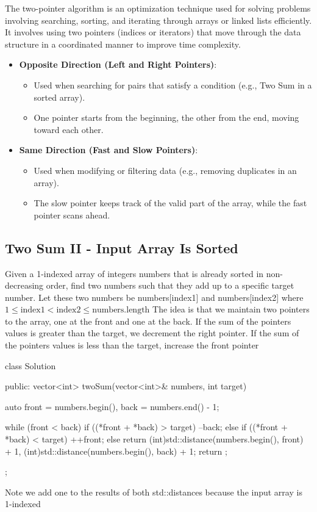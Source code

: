 \documentclass{report}
\begin{document}
\pagebreak 
{}
\bigbreak \noindent 
The two-pointer algorithm is an optimization technique used for solving problems involving searching, sorting, and iterating through arrays or linked lists efficiently. It involves using two pointers (indices or iterators) that move through the data structure in a coordinated manner to improve time complexity.
\begin{itemize}
    \item \textbf{Opposite Direction (Left and Right Pointers)}:
        \begin{itemize}
            \item Used when searching for pairs that satisfy a condition (e.g., Two Sum in a sorted array).
            \item One pointer starts from the beginning, the other from the end, moving toward each other.
        \end{itemize}
    \item \textbf{Same Direction (Fast and Slow Pointers)}:
        \begin{itemize}
            \item Used when modifying or filtering data (e.g., removing duplicates in an array).
            \item The slow pointer keeps track of the valid part of the array, while the fast pointer scans ahead.
        \end{itemize}
\end{itemize}

\bigbreak \noindent 
\subsection{Two Sum II - Input Array Is Sorted}
\bigbreak \noindent 
Given a 1-indexed array of integers numbers that is already sorted in non-decreasing order, find two numbers such that they add up to a specific target number. Let these two numbers be numbers[index1] and numbers[index2] where $1 \leq \text{index1} < \text{index2} \leq \text{numbers.length}$
\bigbreak \noindent 
The idea is that we maintain two pointers to the array, one at the front and one at the back. If the sum of the pointers values is greater than the target, we decrement the right pointer. If the sum of the pointers values is less than the target, increase the front pointer
\bigbreak \noindent 
\begin{cppcode}
    class Solution {
        public:
        vector<int> twoSum(vector<int>& numbers, int target) {
            auto front = numbers.begin(), back = numbers.end() - 1;

            while (front < back) {
                if ((*front + *back) > target) {
                    --back;
                } else if ((*front + *back) < target) {
                    ++front;
                } else {
                    return {(int)std::distance(numbers.begin(), front) + 1, (int)std::distance(numbers.begin(), back) + 1};
                }
            }
            return {};
        }
    };
\end{cppcode}
\bigbreak \noindent 
Note we add one to the results of both std::distances because the input array is 1-indexed
\end{document}
